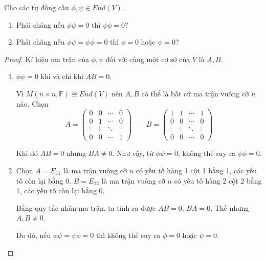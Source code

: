 \begin{exercise}
    Cho các tự đồng cấu $\phi, \psi\in End(V)$.
    \begin{enumerate}[label = (\alph*)]
        \item Phải chăng nếu $\phi\psi = 0$ thì $\psi\phi = 0$?
        \item Phải chăng nếu $\phi\psi = \psi\phi = 0$ thì $\phi = 0$ hoặc $\psi = 0$?
    \end{enumerate}
\end{exercise}

\begin{proof}
    Kí hiệu ma trận của $\phi, \psi$ đối với cùng một cơ sở của $V$ là $A, B$.
    \begin{enumerate}[label = (\alph*)]
        \item $\phi\psi = 0$ khi và chỉ khi $AB = 0$.
              
              Vì $M(n\times n,\mathbb{F})\cong End(V)$ nên $A, B$ có thể là bất cứ ma trận vuông cỡ $n$ nào. Chọn
              \[
                  A =
                  \begin{pmatrix}
                      0      & 0      & \cdots & 0      \\
                      0      & 1      & \cdots & 0      \\
                      \vdots & \vdots & \ddots & \vdots \\
                      0      & 0      & \cdots & 1
                  \end{pmatrix}\qquad
                  B =
                  \begin{pmatrix}
                      1      & 1      & \cdots & 1      \\
                      0      & 0      & \cdots & 0      \\
                      \vdots & \vdots & \ddots & \vdots \\
                      0      & 0      & \cdots & 0
                  \end{pmatrix}
              \]
              
              Khi đó $AB = 0$ nhưng $BA\ne 0$. Như vậy, từ $\phi\psi = 0$, không thể suy ra $\psi\phi = 0$.
        \item Chọn $A = E_{11}$ là ma trận vuông cỡ $n$ có yếu tố hàng 1 cột 1 bằng 1, các yếu tố còn lại bằng 0. $B = E_{22}$ là ma trận vuông cỡ $n$ có yếu tố hàng 2 cột 2 bằng 1, các yếu tố còn lại bằng 0.
              
              Bằng quy tắc nhân ma trận, ta tính ra được $AB = 0$, $BA = 0$. Thế nhưng $A, B\ne 0$.
              
              Do đó, nếu $\phi\psi = \psi\phi = 0$ thì không thể suy ra $\phi = 0$ hoặc $\psi = 0$.
    \end{enumerate}
\end{proof}

